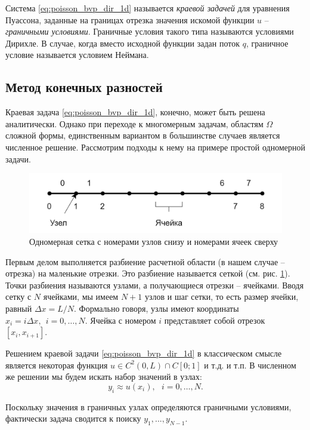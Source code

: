 \documentclass[a4paper, 11pt]{article}
\begin{document}
Система \eqref{eq:poisson_bvp_dir_1d} называется \textit{краевой задачей} для уравнения Пуассона, заданные на границах отрезка значения искомой функции $u$ -- \textit{граничными условиями}. Граничные условия такого типа называются условиями Дирихле. В случае, когда вместо исходной функции задан поток $q$, граничное условие называется условием Неймана.

\subsection{Метод конечных разностей}
Краевая задача \eqref{eq:poisson_bvp_dir_1d}, конечно, может быть решена аналитически. Однако при переходе к многомерным задачам, областям $\Omega$ сложной формы, единственным вариантом в большинстве случаев является численное решение. Рассмотрим подходы к нему на примере простой одномерной задачи.
\begin{figure}[h] \centering
	\includegraphics[width=\textwidth]{mesh1d}
	\caption{Одномерная сетка с номерами узлов снизу и номерами ячеек сверху\label{pic:mesh1d}}
\end{figure}

Первым делом выполняется разбиение расчетной области (в нашем случае -- отрезка) на маленькие отрезки. Это разбиение называется сеткой (см. рис. \ref{pic:mesh1d}). Точки разбиения называются узлами, а получающиеся отрезки -- ячейками. Вводя сетку с $N$ ячейками, мы имеем $N+1$ узлов и шаг сетки, то есть размер ячейки, равный $\Delta x = L/N$. Формально говоря, узлы имеют координаты $x_i = i\Delta x,~~i = 0, \dots, N$. Ячейка с номером $i$ представляет собой отрезок $[x_i, x_{i+1}]$.

Решением краевой задачи \eqref{eq:poisson_bvp_dir_1d} в классическом смысле является некоторая функция $u \in C^2(0,L) \cap C[0;1]$ и т.д. и т.п. В численном же решении мы будем искать набор значений в узлах:
\begin{equation}
	y_i \approx u(x_i),~~~i = 0, \dots, N.
\end{equation}

Поскольку значения в граничных узлах определяются граничными условиями, фактически задача сводится к поиску $y_1, ..., y_{N-1}$. 
\end{document}
